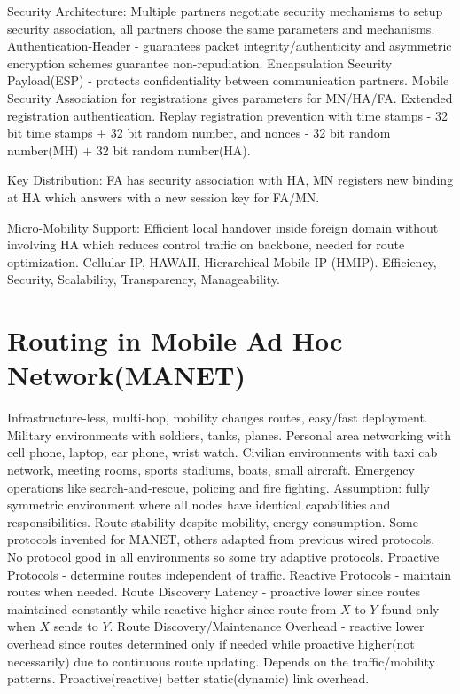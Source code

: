 \documentclass[8pt]{extarticle}
\begin{document}
\begin{multicols}{2}
Security Architecture: Multiple partners negotiate security mechanisms to setup security association, all partners choose the same parameters and mechanisms. Authentication-Header - guarantees packet integrity/authenticity and asymmetric encryption schemes guarantee non-repudiation. Encapsulation Security Payload(ESP) - protects confidentiality between communication partners. Mobile Security Association for registrations gives parameters for MN/HA/FA. Extended registration authentication. Replay registration prevention with  time stamps - 32 bit time stamps + 32 bit random number, and nonces - 32 bit random number(MH) + 32 bit random number(HA).

Key Distribution: FA has security association with HA, MN registers new binding at HA which answers with a new session key for FA/MN. 

Micro-Mobility Support: Efficient local handover inside foreign domain without involving HA which reduces control traffic on backbone, needed for route optimization. Cellular IP, HAWAII, Hierarchical Mobile IP (HMIP). Efficiency, Security, Scalability, Transparency, Manageability.

\section{Routing in Mobile Ad Hoc Network(MANET)}

Infrastructure-less, multi-hop, mobility changes routes, easy/fast deployment. Military environments with soldiers, tanks, planes. Personal area networking with cell phone, laptop, ear phone, wrist watch. Civilian environments with taxi cab network, meeting rooms, sports stadiums, boats, small aircraft. Emergency operations like search-and-rescue, policing and fire fighting. Assumption: fully symmetric environment where all nodes have identical capabilities and responsibilities. Route stability despite mobility, energy consumption. Some protocols invented for MANET, others adapted from previous wired protocols. No protocol good in all environments so some try adaptive protocols. Proactive Protocols - determine routes independent of traffic. Reactive Protocols - maintain routes when needed. Route Discovery Latency - proactive lower since routes maintained constantly while reactive higher since route from $X$ to $Y$ found only when $X$ sends to $Y$. Route Discovery/Maintenance Overhead - reactive lower overhead since routes determined only if needed while proactive higher(not necessarily) due to continuous route updating. Depends on the traffic/mobility patterns. Proactive(reactive) better static(dynamic) link overhead.


\end{multicols}
\end{document}
